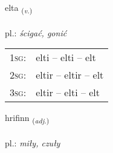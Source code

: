 \documentclass[frontgrid, backgrid]{flacards}\usepackage[]{graphicx}\usepackage[]{xcolor}
\begin{document}
\renewcommand{\flhead}{\vskip5pt \fboxsep=0pt {\small\bfseries\footnotesize Sagnorð | czasownik}}
\renewcommand{\fcfoot}{\vskip5pt \fboxsep=0pt \hspace{2pt}{\small\bfseries\footnotesize 3K}}

\renewcommand{\blhead}{\vskip5pt {\small\bfseries\footnotesize Sagnorð | czasownik }}
\renewcommand{\bcfoot}{\vskip5pt \hspace{2pt}{\small\bfseries\footnotesize 3K}}


{elta \small{\textsubscript{(\textit{v.})}} \\[1ex] %
\textphonetic{[ɛl̥ta]} \\
pl.: \emph{ścigać, gonić} \\  [2ex]
\renewcommand*{\arraystretch}{0.8}
\begin{tabular}{p{1cm}l}
\textsc{1sg}: & elti -- elti -- elt \\ 
\textsc{2sg}: & eltir -- eltir -- elt \\ 
\textsc{3sg}: & eltir -- elti -- elt \\ 
\end{tabular}
}

\renewcommand{\flhead}{\vskip5pt \fboxsep=0pt {\small\bfseries\footnotesize Lýsingarorð | przymiotnik}}
\renewcommand{\fcfoot}{\vskip5pt \fboxsep=0pt \hspace{2pt}{\small\bfseries\footnotesize 3K}}

\renewcommand{\blhead}{\vskip5pt {\small\bfseries\footnotesize Lýsingarorð | przymiotnik }}
\renewcommand{\bcfoot}{\vskip5pt \hspace{2pt}{\small\bfseries\footnotesize 3K}}


{hrifinn \small{\textsubscript{(\textit{adj.})}} \\[1ex] %
\textphonetic{[r̥ɪːvɪn]} \\
pl.: \emph{miły, czuły} \\  [2ex]
\renewcommand*{\arraystretch}{0.8}
}
\end{document}
